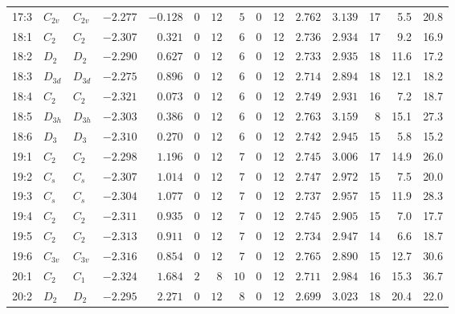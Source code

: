 \begin{table}[ht!]
{\begin{tabular}{lllrrrrrrrrrrrr}
17:3    & $C_{2v}$ & $C_{2v}$ & $-2.277$ & $-0.128$ & $0$ & $12$ & $5$      & $0$ & 12 & $2.762$ & $3.139$ & 17  & 5.5  &  20.8    \\
18:1    & $C_2$    & $C_{2 }$ & $-2.307$ & $0.321$  & $0$ & $12$ & $6$      & $0$ & 12 & $2.736$ & $2.934$ & 17  & 9.2  &  16.9    \\
18:2    & $D_2$    & $D_{2 }$ & $-2.290$ & $0.627$  & $0$ & $12$ & $6$      & $0$ & 12 & $2.733$ & $2.935$ & 18  & 11.6 &  17.2    \\
18:3    & $D_{3d}$ & $D_{3d}$ & $-2.275$ & $0.896$  & $0$ & $12$ & $6$      & $0$ & 12 & $2.714$ & $2.894$ & 18  & 12.1 &  18.2    \\
18:4    & $C_2$    & $C_{2 }$ & $-2.321$ & $0.073$  & $0$ & $12$ & $6$      & $0$ & 12 & $2.749$ & $2.931$ & 16  & 7.2  &  18.7    \\
18:5    & $D_{3h}$ & $D_{3h}$ & $-2.303$ & $0.386$  & $0$ & $12$ & $6$      & $0$ & 12 & $2.763$ & $3.159$ & 8   & 15.1 &  27.3    \\
18:6    & $D_3$    & $D_{3 }$ & $-2.310$ & $0.270$  & $0$ & $12$ & $6$      & $0$ & 12 & $2.742$ & $2.945$ & 15  & 5.8  &  15.2    \\
19:1    & $C_2$    & $C_{2 }$ & $-2.298$ & $1.196$  & $0$ & $12$ & $7$      & $0$ & 12 & $2.745$ & $3.006$ & 17  & 14.9 &  26.0    \\
19:2    & $C_s$    & $C_{s }$ & $-2.307$ & $1.014$  & $0$ & $12$ & $7$      & $0$ & 12 & $2.747$ & $2.972$ & 15  & 7.5  &  20.0    \\
19:3    & $C_s$    & $C_{s }$ & $-2.304$ & $1.077$  & $0$ & $12$ & $7$      & $0$ & 12 & $2.737$ & $2.957$ & 15  & 11.9 &  28.3    \\
19:4    & $C_2$    & $C_{2 }$ & $-2.311$ & $0.935$  & $0$ & $12$ & $7$      & $0$ & 12 & $2.745$ & $2.905$ & 15  & 7.0  &  17.7    \\
19:5    & $C_2$    & $C_{2 }$ & $-2.313$ & $0.911$  & $0$ & $12$ & $7$      & $0$ & 12 & $2.734$ & $2.947$ & 14  & 6.6  &  18.7    \\
19:6    & $C_{3v}$ & $C_{3v}$ & $-2.316$ & $0.854$  & $0$ & $12$ & $7$      & $0$ & 12 & $2.765$ & $2.890$ & 15  & 12.7 &  30.6    \\
20:1    & $C_2$    & $C_{1 }$ & $-2.324$ & $1.684$  & $2$ & $8$  & $10$     & $0$ & 12 & $2.711$ & $2.984$ & 16  & 15.3 &  36.7    \\
20:2    & $D_2$    & $D_{2 }$ & $-2.295$ & $2.271$  & $0$ & $12$ & $8$      & $0$ & 12 & $2.699$ & $3.023$ & 18  & 20.4 &  22.0    \\

\end{tabular}}
\end{table}
